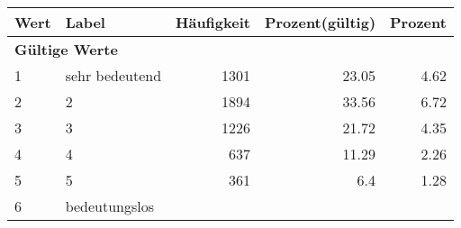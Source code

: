      \begin{longtable}{lXrrr}
     \toprule
     \textbf{Wert} & \textbf{Label} & \textbf{Häufigkeit} & \textbf{Prozent(gültig)} & \textbf{Prozent} \\
     \endhead
     \midrule
     \multicolumn{5}{l}{\textbf{Gültige Werte}}\\

     1 &
     \multicolumn{1}{X}{ sehr bedeutend   } &


       \num{1301} &
       \num[round-mode=places,round-precision=2]{23,05} &
         \num[round-mode=places,round-precision=2]{4,62} \\

     2 &
     \multicolumn{1}{X}{ 2   } &


       \num{1894} &
       \num[round-mode=places,round-precision=2]{33,56} &
         \num[round-mode=places,round-precision=2]{6,72} \\

     3 &
     \multicolumn{1}{X}{ 3   } &


       \num{1226} &
       \num[round-mode=places,round-precision=2]{21,72} &
         \num[round-mode=places,round-precision=2]{4,35} \\

     4 &
     \multicolumn{1}{X}{ 4   } &


       \num{637} &
       \num[round-mode=places,round-precision=2]{11,29} &
         \num[round-mode=places,round-precision=2]{2,26} \\

     5 &
     \multicolumn{1}{X}{ 5   } &


       \num{361} &
       \num[round-mode=places,round-precision=2]{6,4} &
         \num[round-mode=places,round-precision=2]{1,28} \\

     6 &
     \multicolumn{1}{X}{ bedeutungslos   } &



\end{longtable}

